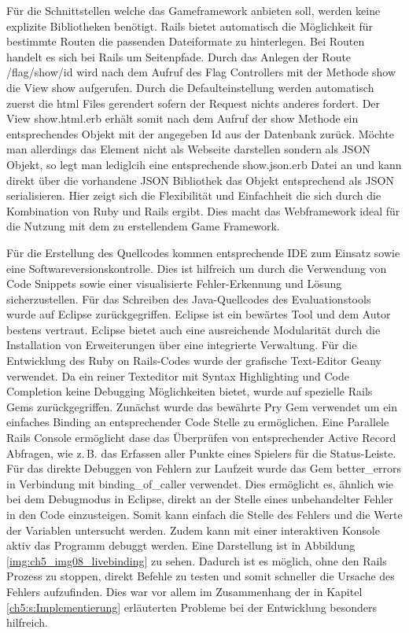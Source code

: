 Für die Schnittstellen welche das Gameframework anbieten soll, werden keine explizite Bibliotheken benötigt. Rails bietet automatisch die Möglichkeit für bestimmte Routen die passenden Dateiformate zu hinterlegen. Bei Routen handelt es sich bei Rails um Seitenpfade. Durch das Anlegen der Route \glqq /flag/show/{id}\grqq{} wird nach dem Aufruf des Flag Controllers mit der Methode show die View show aufgerufen. Durch die Defaulteinstellung werden automatisch zuerst die html Files gerendert sofern der Request nichts anderes fordert. Der View show.html.erb erhält somit nach dem Aufruf der show Methode ein entsprechendes Objekt mit der angegeben Id aus der Datenbank zurück. Möchte man allerdings das Element nicht als Webseite darstellen sondern als JSON Objekt, so legt man lediglcih eine entsprechende show.json.erb Datei an und kann direkt über die vorhandene JSON Bibliothek das Objekt entsprechend als JSON serialisieren.
Hier zeigt sich die Flexibilität und Einfachheit die sich durch die Kombination von Ruby und Rails ergibt. Dies macht das Webframework ideal für die Nutzung mit dem zu erstellendem Game Framework.

Für die Erstellung des Quellcodes kommen entsprechende IDE zum Einsatz sowie eine Softwareversionskontrolle. Dies ist hilfreich um durch die Verwendung von Code Snippets sowie einer visualisierte Fehler-Erkennung und Lösung sicherzustellen.
Für das Schreiben des Java-Quellcodes des Evaluationstools wurde auf Eclipse zurückgegriffen. Eclipse ist ein bewärtes Tool und dem Autor bestens vertraut. Eclipse bietet auch eine ausreichende Modularität durch die Installation von Erweiterungen über eine integrierte Verwaltung.
Für die Entwicklung des Ruby on Rails-Codes wurde der grafische Text-Editor Geany verwendet. Da ein reiner Texteditor mit Syntax Highlighting und Code Completion keine Debugging Möglichkeiten bietet, wurde auf spezielle Rails Gems zurückgegriffen.
Zunächst wurde das bewährte \glqq Pry\grqq{} Gem verwendet um ein einfaches Binding an entsprechender Code Stelle zu ermöglichen. Eine Parallele Rails Console ermöglicht dase das Überprüfen von entsprechender Active Record Abfragen, wie z.\,B. das Erfassen aller Punkte eines Spielers für die Status-Leiste. Für das direkte Debuggen von Fehlern zur Laufzeit  wurde das Gem \glqq better\_errors\grqq{} in Verbindung mit \glqq binding\_of\_caller\grqq{} verwendet. Dies ermöglicht es, ähnlich wie bei dem Debugmodus in Eclipse, direkt an der Stelle eines unbehandelter Fehler in den Code einzusteigen. Somit kann einfach die Stelle des Fehlers und die Werte der Variablen untersucht werden. Zudem kann mit einer interaktiven Konsole aktiv das Programm debuggt werden. Eine Darstellung ist in Abbildung \ref{img:ch5_img08_livebinding} zu sehen. Dadurch ist es möglich, ohne den Rails Prozess zu stoppen, direkt Befehle zu testen und somit schneller die Ursache des Fehlers aufzufinden. Dies war vor allem im Zusammenhang der in Kapitel \ref{ch5:s:Implementierung} erläuterten Probleme bei der Entwicklung besonders hilfreich.

